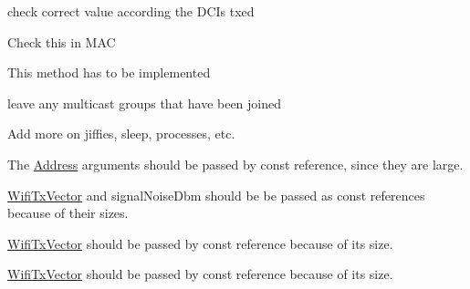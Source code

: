 \begin{DoxyRefList}
check correct value according the D\+C\+Is txed  
\item[\label{todo__todo000163}%
\hypertarget{todo__todo000163}{}%
Member \hyperlink{classns3_1_1UanNetDevice_a2e7ad23d65650a02984e6c6afaa1744b}{ns3\+:\+:Uan\+Net\+Device\+:\+:Set\+Mtu} (const uint16\+\_\+t mtu)]Check this in M\+AC  
\item[\label{todo__todo000164}%
\hypertarget{todo__todo000164}{}%
Member \hyperlink{classns3_1_1UanPhyDual_aef6554f09748e765f01ab3b9d86acb7a}{ns3\+:\+:Uan\+Phy\+Dual\+:\+:Set\+Sleep\+Mode} (bool sleep)]This method has to be implemented  
\item[\label{todo__todo000066}%
\hypertarget{todo__todo000066}{}%
Member \hyperlink{classns3_1_1UdpSocketImpl_a47080dd8189ab3065c5093470b123cec}{ns3\+:\+:Udp\+Socket\+Impl\+:\+:$\sim$\+Udp\+Socket\+Impl} ()]leave any multicast groups that have been joined  
\item[\label{todo__todo000008}%
\hypertarget{todo__todo000008}{}%
Class \hyperlink{classns3_1_1WallClockSynchronizer}{ns3\+:\+:Wall\+Clock\+Synchronizer} ]Add more on jiffies, sleep, processes, etc. 
\item[\label{todo__todo000165}%
\hypertarget{todo__todo000165}{}%
Member \hyperlink{classns3_1_1WaveNetDevice_a9f5269cddc734b4dddff1e96f577a28f}{ns3\+:\+:Wave\+Net\+Device\+:\+:m\+\_\+address\+Change} ]The \hyperlink{classns3_1_1Address}{Address} arguments should be passed by const reference, since they are large.  
\item[\label{todo__todo000178}%
\hypertarget{todo__todo000178}{}%
Member \hyperlink{classns3_1_1WifiPhy_ae1bb9ca40837a43219f2be0aadbdc02b}{ns3\+:\+:Wifi\+Phy\+:\+:m\+\_\+phy\+Monitor\+Sniff\+Rx\+Trace} ]\hyperlink{classns3_1_1WifiTxVector}{Wifi\+Tx\+Vector} and signal\+Noise\+Dbm should be be passed as const references because of their sizes.  
\item[\label{todo__todo000179}%
\hypertarget{todo__todo000179}{}%
Member \hyperlink{classns3_1_1WifiPhy_ab11e6362f76c35f9a4c467c6c7765861}{ns3\+:\+:Wifi\+Phy\+:\+:m\+\_\+phy\+Monitor\+Sniff\+Tx\+Trace} ]\hyperlink{classns3_1_1WifiTxVector}{Wifi\+Tx\+Vector} should be passed by const reference because of its size.  
\item[\label{todo__todo000176}%
\hypertarget{todo__todo000176}{}%
Member \hyperlink{classns3_1_1WifiPhy_a3bfbe4d94e53d23626b60bb3b2f80e37}{ns3\+:\+:Wifi\+Phy\+:\+:Monitor\+Sniffer\+Rx\+Callback} )(Ptr$<$ const Packet $>$ packet, uint16\+\_\+t channel\+Freq\+Mhz, \hyperlink{classns3_1_1WifiTxVector}{Wifi\+Tx\+Vector} tx\+Vector, \hyperlink{structns3_1_1MpduInfo}{Mpdu\+Info} a\+Mpdu, \hyperlink{structns3_1_1SignalNoiseDbm}{Signal\+Noise\+Dbm} signal\+Noise)]\hyperlink{classns3_1_1WifiTxVector}{Wifi\+Tx\+Vector} should be passed by const reference because of its size.  

\end{DoxyRefList}
